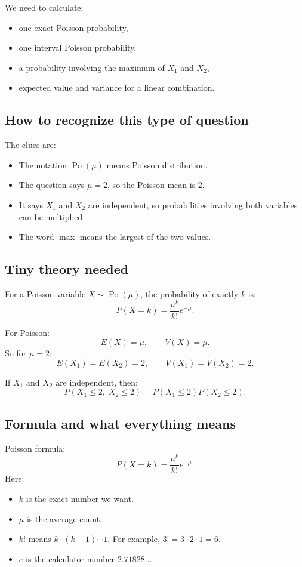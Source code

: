 \documentclass[11pt,a4paper]{article}
\begin{document}
We need to calculate:
\begin{itemize}[leftmargin=*]
    \item one exact Poisson probability,
    \item one interval Poisson probability,
    \item a probability involving the maximum of \(X_1\) and \(X_2\),
    \item expected value and variance for a linear combination.
\end{itemize}

\subsection*{How to recognize this type of question}
The clues are:
\begin{itemize}[leftmargin=*]
    \item The notation \(\operatorname{Po}(\mu)\) means Poisson distribution.
    \item The question says \(\mu=2\), so the Poisson mean is \(2\).
    \item It says \(X_1\) and \(X_2\) are independent, so probabilities involving both variables can be multiplied.
    \item The word \(\max\) means the largest of the two values.
\end{itemize}

\subsection*{Tiny theory needed}
For a Poisson variable \(X\sim\operatorname{Po}(\mu)\), the probability of exactly \(k\) is:
\[
P(X=k)=\frac{\mu^k}{k!}e^{-\mu}.
\]

For Poisson:
\[
E(X)=\mu,\qquad V(X)=\mu.
\]
So for \(\mu=2\):
\[
E(X_1)=E(X_2)=2,\qquad V(X_1)=V(X_2)=2.
\]

If \(X_1\) and \(X_2\) are independent, then:
\[
P(X_1\le 2,\;X_2\le 2)=P(X_1\le 2)P(X_2\le 2).
\]

\subsection*{Formula and what everything means}
Poisson formula:
\[
P(X=k)=\frac{\mu^k}{k!}e^{-\mu}.
\]
Here:
\begin{itemize}[leftmargin=*]
    \item \(k\) is the exact number we want.
    \item \(\mu\) is the average count.
    \item \(k!\) means \(k\cdot(k-1)\cdots 1\). For example, \(3!=3\cdot2\cdot1=6\).
    \item \(e\) is the calculator number \(2.71828...\).
\end{itemize}
\end{document}
